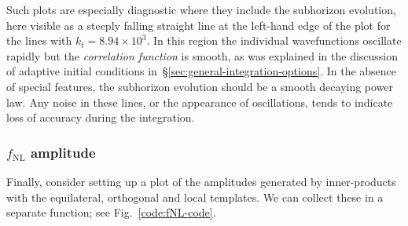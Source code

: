 \documentclass[11pt,a4paper]{article}
\newcommand{\fNL}{f_{\mathrm{NL}}}
\begin{document}
Such plots are especially diagnostic where they include the subhorizon
evolution, here visible as a steeply falling straight line at the left-hand
edge of the plot for the lines with $k_t = 8.94 \times 10^3$.
In this region the individual wavefunctions oscillate rapidly but the
\emph{correlation function} is smooth, as was explained in the discussion of
adaptive initial conditions in~\S\ref{sec:general-integration-options}.
In the absence of special features, the subhorizon evolution should be a smooth
decaying power law. Any noise in these lines, or the appearance of oscillations,
tends to indicate loss of accuracy during the integration.

\subsubsection{$\fNL$ amplitude}
Finally, consider setting up a plot of the amplitudes generated by
inner-products with the equilateral, orthogonal and local
templates.
We can collect these in a separate function; see Fig.~\ref{code:fNL-code}.
\end{document}
